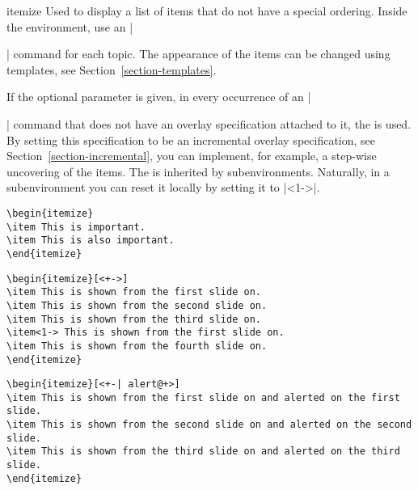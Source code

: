 \begin{environment}{{itemize}}
  Used to display a list of items that do not have a special
  ordering. Inside the environment, use an |\item| command for
  each topic. The appearance of the items can be changed using
  templates, see Section~\ref{section-templates}.

  If the optional parameter  is
  given, in every occurrence of an |\item| command that does not have
  an overlay specification attached to it, the  is used. By setting this specification to be an
  incremental overlay specification, see
  Section~\ref{section-incremental}, you can implement, for example, a
  step-wise uncovering of the items. The  is inherited by subenvironments. Naturally, in a
  subenvironment you can reset it locally by setting it to |<1->|.
  \example
\begin{verbatim}
\begin{itemize}
\item This is important.
\item This is also important.
\end{itemize}
\end{verbatim}
  
  \example
\begin{verbatim}
\begin{itemize}[<+->]
\item This is shown from the first slide on.
\item This is shown from the second slide on.
\item This is shown from the third slide on.
\item<1-> This is shown from the first slide on.
\item This is shown from the fourth slide on.    
\end{itemize}
\end{verbatim}
  
  \example
\begin{verbatim}
\begin{itemize}[<+-| alert@+>]
\item This is shown from the first slide on and alerted on the first slide.
\item This is shown from the second slide on and alerted on the second slide.
\item This is shown from the third slide on and alerted on the third slide.
\end{itemize}
\end{verbatim}
  

\end{environment}
